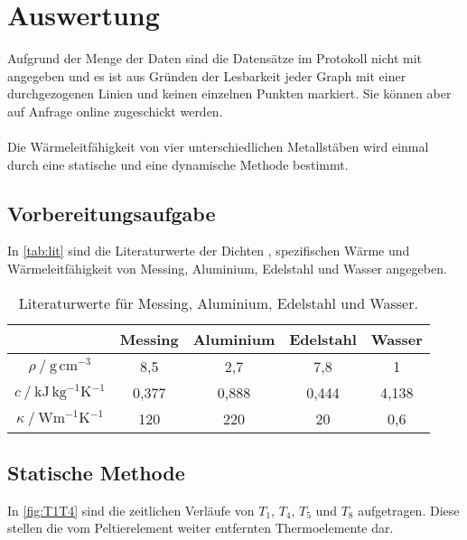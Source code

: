 \section{Auswertung}
\label{sec:Auswertung}
Aufgrund der Menge der Daten sind die Datensätze im Protokoll nicht mit angegeben und es ist aus Gründen der Lesbarkeit jeder Graph mit einer durchgezogenen Linien
und keinen einzelnen Punkten markiert.
Sie können aber auf Anfrage online zugeschickt werden.\\
\\
Die Wärmeleitfähigkeit von vier unterschiedlichen Metallstäben wird einmal durch eine statische und
eine dynamische Methode bestimmt.

\subsection{Vorbereitungsaufgabe}
\label{sec:Vorbereitung}
In \autoref{tab:lit} sind die Literaturwerte der Dichten \cite{dichten}, spezifischen Wärme \cite{spezifischeWaerme} und Wärmeleitfähigkeit \cite{waermeleitfähigkeit}
von Messing, Aluminium, Edelstahl und Wasser angegeben.
\begin{table}
  \centering
  \caption{Literaturwerte für Messing, Aluminium, Edelstahl und Wasser.}
  \label{tab:lit}
  \begin{tabular}{c| c c c c}
    \toprule
     & Messing & Aluminium & Edelstahl & Wasser \\
    \midrule
    $\rho \mathbin{/} \si{\gram\,\cm^{-3}}$                       & 8,5 & 2,7 & 7,8 & 1 \\
    $c \mathbin{/} \si{\kilo\joule\,\kilogram^{-1}\kelvin^{-1}}$  & 0,377 & 0,888 & 0,444 & 4,138 \\
    $\kappa \mathbin{/}\si{\watt\meter^{-1}\kelvin^{-1}}$         & 120 & 220 & 20 & 0,6 \\
  \end{tabular}
\end{table} 

\subsection{Statische Methode}
\label{sec:stat}

In \autoref{fig:T1T4} sind die zeitlichen Verläufe von $T_1$, $T_4$, $T_5$ und $T_8$ aufgetragen. Diese stellen die vom Peltierelement weiter
entfernten Thermoelemente dar.

